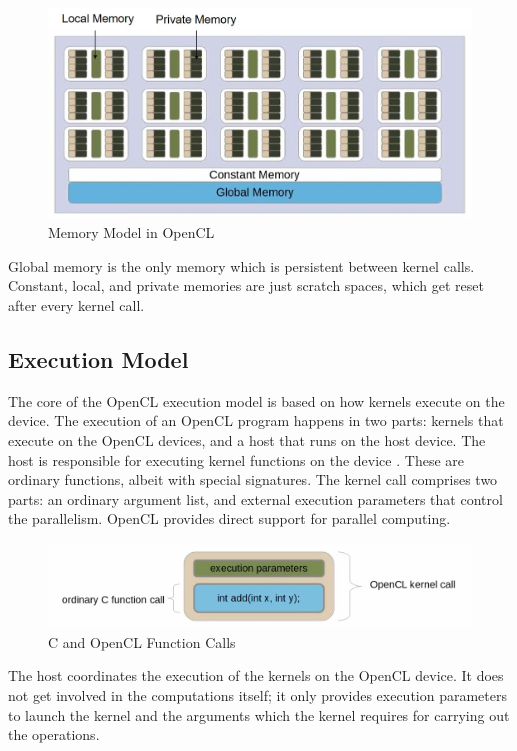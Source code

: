 \begin{itemize}
\begin{figure}[h!]
  \includegraphics[width=\linewidth]{figures/OpenCL_Memory_Model.jpg}
  \caption{Memory Model in OpenCL \cite{opencl_ajg}}
  \label{fig:opencl2}
\end{figure}
\end{itemize}
Global memory is the only memory which is persistent between kernel calls. Constant, local, and private memories are just scratch spaces, which get reset after every kernel call.

 \subsection{Execution Model}
The core of the OpenCL execution model is based on how kernels execute on the device. The execution of an OpenCL program happens in two parts: kernels that execute on the OpenCL devices, and a host that runs on the host device. The host is responsible for executing kernel functions on the device \cite{opencl_khronos}. These are ordinary functions, albeit with special signatures. The kernel call comprises two parts: an ordinary argument list, and external execution parameters that control the parallelism. OpenCL provides direct support for parallel computing. \newline\newline
\begin{figure}[h!]
\includegraphics[width=\linewidth]{figures/C_and_OpenCL_Function_Calls.png}
\caption{C and OpenCL Function Calls \cite{opencl_ajg}}
\label{fig:opencl3}
\end{figure}
The host coordinates the execution of the kernels on the OpenCL device. It does not get involved in the computations itself; it only provides execution parameters to launch the kernel and the arguments which the kernel requires for carrying out the operations. 
